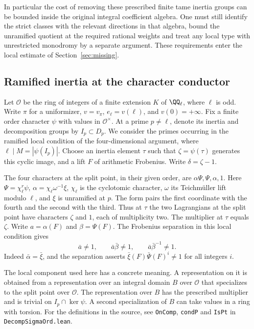 \documentclass[a4paper,11pt]{article}
\theoremstyle{definition}
\theoremstyle{remark}
\numberwithin{equation}{section}
\begin{document}
In particular the cost of removing these prescribed finite
tame inertia groups can be bounded inside the original
integral coefficient algebra. One must still identify the
strict classes with the relevant directions in that algebra,
bound the unramified quotient at the required rational
weights and treat any local type with unrestricted monodromy
by a separate argument. These requirements enter the local
estimate of Section~\ref{sec:missing}.


\subsection{Ramified inertia at the character conductor}
\label{sec:conductorinertia655}

Let \(\mathcal O\) be the ring of integers of a finite extension \(K\)
of \(\QQ_\ell\), where \(\ell\) is odd. Write \(\pi\) for a uniformizer,
\(v=v_\pi\), \(e_\ell=v(\ell)\), and \(v(0)=+\infty\).
Fix a finite order character \(\psi\) with values in \(\mathcal O^\times\).
At a prime \(p\ne\ell\), denote its inertia and decomposition groups
by \(I_p\subset D_p\). We consider the primes occurring in the
ramified local condition of the four-dimensional argument, where
\(\ell\mid M=|\psi(I_p)|\). Choose an inertia element \(\tau\) such
that \(\zeta=\psi(\tau)\) generates this cyclic image, and a lift \(F\)
of arithmetic Frobenius. Write \(\delta=\zeta-1\).

The four characters at the split point, in their given order, are
\(\alpha\Psi,\Psi,\alpha,1\). Here \(\Psi=\chi_\ell^r\psi\),
\(\alpha=\chi_\ell\omega^{-1}\xi\), \(\chi_\ell\) is the
cyclotomic character, \(\omega\) its Teichm\"uller lift modulo \(\ell\),
and \(\xi\) is unramified at \(p\). The form pairs the first coordinate
with the fourth and the second with the third. Thus at \(\tau\) the two
Lagrangians at the split point have characters \(\zeta\) and \(1\),
each of multiplicity two. The multiplier at \(\tau\) equals \(\zeta\).
Write \(a=\alpha(F)\) and \(\beta=\Psi(F)\). The Frobenius separation
in this local condition gives
\[
  \bar a\ne1,\qquad \bar a\bar\beta\ne1,\qquad
  \bar a\bar\beta^{-1}\ne1 .
\]
Indeed \(\bar\alpha=\bar\xi\), and the separation asserts
\(\bar\xi(F)\bar\Psi(F)^i\ne1\) for all integers \(i\).

The local component used here has a concrete meaning. A representation
on it is obtained from a representation over an integral domain
\(B\) over \(\mathcal O\) that specializes to the split point over
\(\mathcal O\). The representation over \(B\) has the prescribed
multiplier and is trivial on \(I_p\cap\ker\psi\). A second
specialization of \(B\) can take values in a ring with torsion.
For the definitions in the source, see \texttt{OnComp},
\texttt{condP} and \texttt{IsPt} in \texttt{DecompSigmaOrd.lean}.
\end{document}
